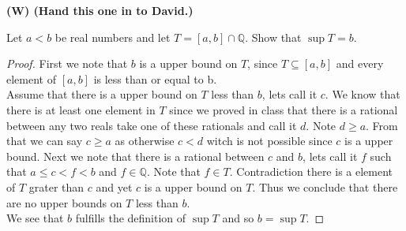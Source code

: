 \documentclass[12pt]{article}
\makeatletter
\theoremstyle{homework}
\newenvironment{exercise}[1]
{\def\@currentlabel{#1}\exercisecore}
{\endexercisecore}
\newcommand\W{{\color{red}\textbf{(W) (Hand this one in to David.)}}}
\newcommand{\Rats}{\ensuremath{\mathbb Q}}
\makeatother
\begin{document}
\newpage
\begin{exercise}{1.4.4} \W 

Let $a<b$ be real numbers and let $T=[a,b]\cap\Rats$.
Show that $\sup T=b$.
\end{exercise}
\begin{proof}
First we note that $b$ is a upper bound on $T$, since $T\subseteq [a,b]$ and every element of $[a,b]$ is less than or equal to b.\\
Assume that there is a upper bound on $T$ less than $b$, lets call it $c$.  We know that there is at least one element in $T$ since we proved in class that there is a rational between any two reals take one of these rationals and call it $d$.  Note $d\geq a$.  From that we can say $c\geq a$ as otherwise $c<d$ witch is not possible since $c$ is a upper bound.  Next we note that there is a rational between $c$ and $b$, lets call it $f$ such that $a\leq c< f< b$ and $f\in\mathbb{Q}$.  Note that $f\in T$.  Contradiction there is a element of $T$ grater than $c$ and yet $c$ is a upper bound on $T$.  Thus we conclude that there are no upper bounds on $T$ less than $b$.\\
We see that $b$ fulfills the definition of $\sup T$ and so $b=\sup T$.
\end{proof}
\end{document}
